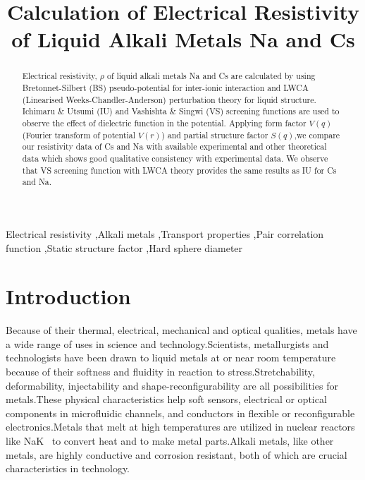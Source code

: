 \documentclass[final,12pt]{elsarticle}
\begin{document}
\begin{frontmatter}

\title{Calculation of Electrical Resistivity of Liquid Alkali Metals Na and Cs}



\begin{abstract}
Electrical resistivity, $\rho$ of liquid alkali metals Na and Cs are calculated by using Bretonnet-Silbert (BS) pseudo-potential for inter-ionic interaction and LWCA (Linearised Weeks-Chandler-Anderson) perturbation theory for liquid structure. Ichimaru \& Utsumi (IU) and Vashishta \& Singwi (VS) screening functions are used to observe the effect of dielectric function in the potential. Applying form factor $V(q)$ (Fourier transform of potential $V(r)$) and partial structure factor $S(q)$,we compare our resistivity data of Cs and Na with available experimental and other theoretical data which shows good qualitative consistency with experimental data. We observe that VS screening function with LWCA theory provides the same results as IU for Cs and Na.

\end{abstract}

\begin{keyword}
Electrical resistivity \sep Alkali metals \sep Transport properties \sep Pair correlation function \sep Static structure factor \sep Hard sphere diameter
\end{keyword}

\end{frontmatter}

\section{Introduction}

Because of their thermal, electrical, mechanical and optical qualities, metals have a wide range of uses in science and technology.Scientists, metallurgists and technologists have been drawn to liquid metals at or near room temperature because of their softness and fluidity in reaction to stress.Stretchability, deformability, injectability and shape-reconfigurability are all possibilities for metals.These physical characteristics help soft sensors, electrical or optical components in microfluidic channels, and conductors in flexible or reconfigurable electronics.Metals that melt at high temperatures are utilized in nuclear reactors like NaK~\cite{Dickey2014} to convert heat and to make metal parts.Alkali metals, like other metals, are highly conductive and corrosion resistant, both of which are crucial characteristics in technology.
\end{document}
